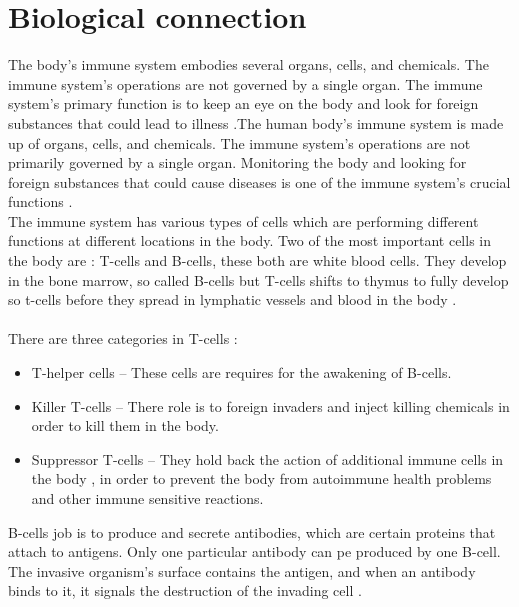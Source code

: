 \documentclass{article}
\begin{document}
\section{Biological connection}
The body's immune system embodies several organs, cells, and chemicals. The immune system's operations are not governed by a single organ. The immune system's primary function is to keep an eye on the body and look for foreign substances that could lead to illness \cite{de2002artificial}.The human body's immune system is made up of organs, cells, and chemicals. The immune system's operations are not primarily governed by a single organ. Monitoring the body and looking for foreign substances that could cause diseases is one of the immune system's crucial functions \cite{scime2005web}.\\
The immune system has various types of cells which are performing different functions at different locations in the body. Two of the most important cells in the body are : T-cells and B-cells, these both are white blood cells. They develop in the bone marrow, so called B-cells but T-cells shifts to thymus to fully develop so t-cells before they spread in lymphatic vessels and blood in the body \cite{aickelin2008artificial}.\\
\\
There are three categories in T-cells \cite{aickelin2008artificial}:
\begin{itemize}
    \item T-helper cells – These cells are requires for the awakening of B-cells.
    \item Killer T-cells – There role is to foreign invaders and inject killing chemicals in order to kill them in the body.
    \item Suppressor T-cells – They hold back the action of additional immune cells in the body , in order to prevent the body from autoimmune health problems and other immune sensitive reactions.
\end{itemize}
B-cells job is to produce and secrete antibodies, which are certain proteins that attach to antigens. Only one particular antibody can pe produced by one B-cell. The invasive organism's surface contains the antigen, and when an antibody binds to it, it signals the destruction of the invading cell \cite{aickelin2008artificial}.\\
\end{document}
